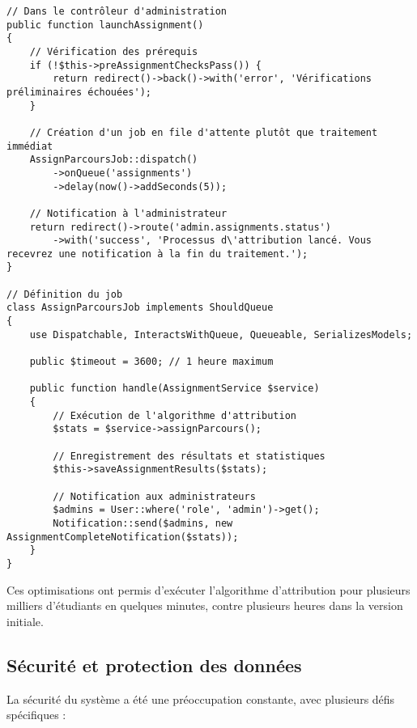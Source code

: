 \documentclass[french,12pt]{report} %
\begin{document}
\begin{lstlisting}[style=phpstyle,caption={Implémentation du traitement asynchrone de l'attribution}]
// Dans le contrôleur d'administration
public function launchAssignment()
{
    // Vérification des prérequis
    if (!$this->preAssignmentChecksPass()) {
        return redirect()->back()->with('error', 'Vérifications préliminaires échouées');
    }
    
    // Création d'un job en file d'attente plutôt que traitement immédiat
    AssignParcoursJob::dispatch()
        ->onQueue('assignments')
        ->delay(now()->addSeconds(5));
    
    // Notification à l'administrateur
    return redirect()->route('admin.assignments.status')
        ->with('success', 'Processus d\'attribution lancé. Vous recevrez une notification à la fin du traitement.');
}

// Définition du job
class AssignParcoursJob implements ShouldQueue
{
    use Dispatchable, InteractsWithQueue, Queueable, SerializesModels;
    
    public $timeout = 3600; // 1 heure maximum
    
    public function handle(AssignmentService $service)
    {
        // Exécution de l'algorithme d'attribution
        $stats = $service->assignParcours();
        
        // Enregistrement des résultats et statistiques
        $this->saveAssignmentResults($stats);
        
        // Notification aux administrateurs
        $admins = User::where('role', 'admin')->get();
        Notification::send($admins, new AssignmentCompleteNotification($stats));
    }
}
\end{lstlisting}

Ces optimisations ont permis d'exécuter l'algorithme d'attribution pour plusieurs milliers d'étudiants en quelques minutes, contre plusieurs heures dans la version initiale.

\subsection{Sécurité et protection des données}

La sécurité du système a été une préoccupation constante, avec plusieurs défis spécifiques :
\end{document}

